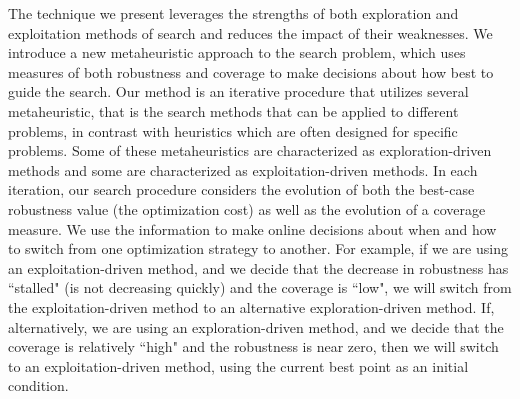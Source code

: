 The technique we present leverages the strengths of both exploration and exploitation methods of search and reduces the impact of their weaknesses.
We introduce a new metaheuristic approach to the search problem, which uses measures of both robustness and coverage to make decisions about how best to guide the search.
Our method is an iterative procedure that utilizes several metaheuristic, that is the search methods that can be applied to different problems, in contrast with heuristics which are often designed for specific problems. Some of these metaheuristics are characterized as exploration-driven methods and some are characterized as exploitation-driven methods.  
In each iteration, our search procedure considers the evolution of both the best-case robustness value (the optimization cost) as well as the evolution of a coverage measure.
We use the information to make online decisions about when and how to switch from one optimization strategy to another. 
For example, if we are using an exploitation-driven method, and we decide that the decrease in robustness has ``stalled" (is not decreasing quickly) and the coverage is ``low", we will switch from the exploitation-driven method to an alternative exploration-driven method.
If, alternatively, we are using an exploration-driven method, and we decide that the coverage is relatively ``high" and the robustness is near zero, then we will switch to an exploitation-driven method, using the current best point as an initial condition.
 


